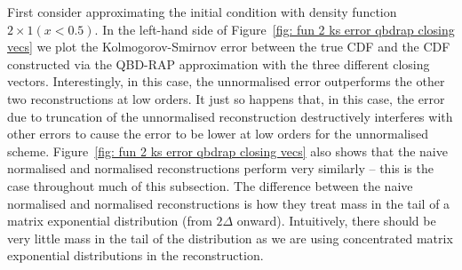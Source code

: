 \begin{example}First consider approximating the initial condition with density function \(2\times 1(x<0.5)\). In the left-hand side of Figure~\ref{fig: fun 2 ks error qbdrap closing vecs} we plot the Kolmogorov-Smirnov error between the true CDF and the CDF constructed via the QBD-RAP approximation with the three different closing vectors. Interestingly, in this case, the unnormalised error outperforms the other two reconstructions at low orders. It just so happens that, in this case, the error due to truncation of the unnormalised reconstruction destructively interferes with other errors to cause the error to be lower at low orders for the unnormalised scheme. Figure~\ref{fig: fun 2 ks error qbdrap closing vecs} also shows that the naive normalised and normalised reconstructions perform very similarly -- this is the case throughout much of this subsection. The difference between the naive normalised and normalised reconstructions is how they treat mass in the tail of a matrix exponential distribution (from \(2\Delta\) onward). Intuitively, there should be very little mass in the tail of the distribution as we are using concentrated matrix exponential distributions in the reconstruction. 


\end{example}
